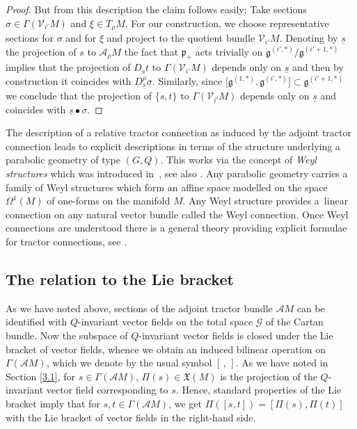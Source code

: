 \documentclass[10pt,a4paper]{amsart}
\numberwithin{equation}{section}
\def\frak{\mathfrak}
\def\Cal{\mathcal}
\newcommand{\si}{\sigma}
\newcommand{\Ga}{\Gamma}
\newcommand{\Om}{\Omega}
\begin{document}
\begin{proof}
But from this description the claim follows easily: Take sections $\si\in\Ga(\Cal
V_{i'}M)$ and $\xi\in T_\rho M$. For our construction, we choose representative
sections \smash{$t\in\Ga\bigl(\Cal A^{(i',*)}M\bigr)$} for $\si$ and \smash{$s\in\Ga\bigl(\Cal A^{(0,*)}M\bigr)$} for
$\xi$ and project \smash{$D_s t+\{s,t\}\in\Ga\bigl(\Cal A^{(i',*)}M\bigr)$} to the quotient bundle
$\Cal V_{i'}M$. Denoting by $\underline{s}$ the projection of $s$ to $\Cal A_\rho M$
the fact that $\frak p_+$ acts trivially on $\frak g^{(i',*)}/\frak g^{(i'+1,*)}$
implies that the projection of $D_s t$ to $\Ga(\Cal V_{i'}M)$ depends only on
$\underline{s}$ and then by construction it coincides with $D^\rho_{\underline
 s}\si$. Similarly, since $\bigl[\frak g^{(1,*)},\frak g^{(i',*)}\bigr]\subset\frak
g^{(i'+1,*)}$ we conclude that the projection of $\{s,t\}$ to $\Ga(\Cal V_{i'}M)$
depends only on $\underline{s}$ and coincides with $\underline{s}\bullet\si$.
\end{proof}

\begin{Remark}\label{rem3.1}
 The description of a relative tractor connection as induced by the adjoint tractor
 connection leads to explicit descriptions in terms of the structure underlying a
 parabolic geometry of type $(G,Q)$. This works via the concept of \textit{Weyl
 structures} which was introduced in~\cite{Weyl}, see also \cite[Section 5]{book}.
 Any parabolic geometry carries a family of Weyl structures which form
 an affine space modelled on the space $\Om^1(M)$ of one-forms on the manifold
 $M$. Any Weyl structure provides a~linear connection on any natural vector
 bundle called the Weyl connection. Once Weyl connections are understood there is a
 general theory providing explicit formulae for tractor connections, see \cite[Section 5.1]{book}.
\end{Remark}

\subsection{The relation to the Lie bracket}\label{3.2}
As we have noted above, sections of the adjoint tractor bundle $\Cal AM$ can be
identified with $Q$-invariant vector fields on the total space $\Cal G$ of the Cartan
bundle. Now the subspace of $Q$-invariant vector fields is closed under the Lie
bracket of vector fields, whence we obtain an induced bilinear operation on $\Ga(\Cal
AM)$, which we denote by the usual symbol $[\, ,\, ]$. As we have noted in Section
\ref{3.1}, for $s\in\Ga(\Cal AM)$, $\Pi(s)\in\frak X(M)$ is the projection of the
$Q$-invariant vector field corresponding to $s$. Hence, standard properties of the Lie
bracket imply that for $s,t\in\Ga(\Cal AM)$, we get $\Pi([s,t])=[\Pi(s),\Pi(t)]$ with
the Lie bracket of vector fields in the right-hand side.
\end{document}
